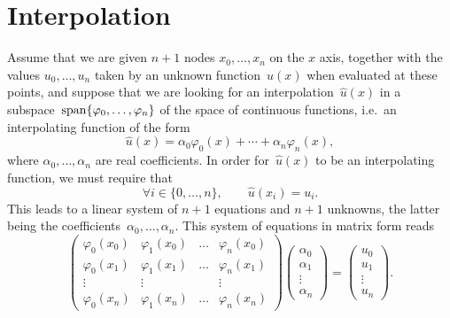 \section{Interpolation}
Assume that we are given $n+1$ nodes $x_0, \dotsc, x_n$ on the $x$ axis,
together with the values $u_0, \dotsc, u_n$ taken by an unknown function~$u(x)$ when evaluated at these points,
and suppose that we are looking for an interpolation~$\widehat u(x)$ in a subspace~$\operatorname{span} \{\varphi_0, \dotsc, \varphi_n\}$
of the space of continuous functions, i.e.~an interpolating function of the form
\[
    \widehat u(x) = \alpha_0 \varphi_0(x) + \dotsb + \alpha_n \varphi_n(x),
\]
where $\alpha_0, \dotsc, \alpha_n$ are real coefficients.
In order for~$\widehat u(x)$ to be an interpolating function,
we must require that
\[
    \forall i \in \{0, \dotsc, n\}, \qquad
    \widehat u(x_i) = u_i.
\]
This leads to a linear system of $n+1$ equations and $n+1$ unknowns,
the latter being the coefficients~$\alpha_0, \dotsc, \alpha_n$.
This system of equations in matrix form reads
\begin{equation}
    \label{eq:linear_system_interpolation}
    \begin{pmatrix}
        \varphi_0(x_0) & \varphi_1(x_0) & \hdots & \varphi_n(x_0) \\
        \varphi_0(x_1) & \varphi_1(x_1) & \hdots & \varphi_n(x_1) \\
        \vdots & \vdots & & \vdots \\
        \varphi_0(x_n) & \varphi_1(x_n) & \hdots & \varphi_n(x_n)
    \end{pmatrix}
    \begin{pmatrix}
        \alpha_0 \\
        \alpha_1 \\
        \vdots \\
        \alpha_n
    \end{pmatrix}
    =
    \begin{pmatrix}
        u_0 \\
        u_1 \\
        \vdots \\
        u_n
    \end{pmatrix}.
\end{equation}

